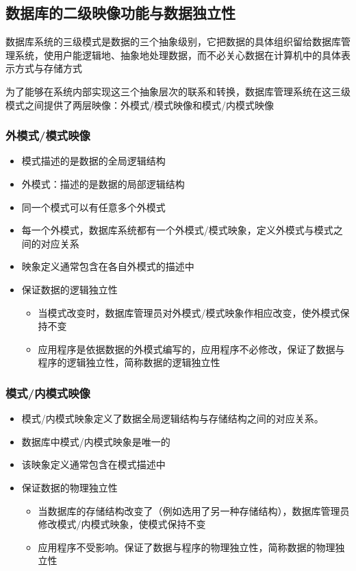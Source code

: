 \subsection{数据库的二级映像功能与数据独立性}
数据库系统的三级模式是数据的三个抽象级别，它把数据的具体组织留给数据库管理系统，使用户能逻辑地、抽象地处理数据，而不必关心数据在计算机中的具体表示方式与存储方式

为了能够在系统内部实现这三个抽象层次的联系和转换，数据库管理系统在这三级模式之间提供了两层映像：外模式/模式映像和模式/内模式映像

\subsubsection{外模式/模式映像}
\begin{itemize}
    \item 模式描述的是数据的全局逻辑结构
    \item 外模式：描述的是数据的局部逻辑结构 
    \item 同一个模式可以有任意多个外模式 
    \item 每一个外模式，数据库系统都有一个外模式/模式映象，定义外模式与模式之间的对应关系
    \item 映象定义通常包含在各自外模式的描述中
    \item 保证数据的逻辑独立性
    \begin{itemize}
        \item 当模式改变时，数据库管理员对外模式/模式映象作相应改变，使外模式保持不变
        \item 应用程序是依据数据的外模式编写的，应用程序不必修改，保证了数据与程序的逻辑独立性，简称数据的逻辑独立性
    \end{itemize}
\end{itemize}

\subsubsection{模式/内模式映像}
\begin{itemize}
    \item 模式/内模式映象定义了数据全局逻辑结构与存储结构之间的对应关系。
    \item 数据库中模式/内模式映象是唯一的
    \item 该映象定义通常包含在模式描述中
    \item 保证数据的物理独立性
    \begin{itemize}
        \item 当数据库的存储结构改变了（例如选用了另一种存储结构），数据库管理员修改模式/内模式映象，使模式保持不变
        \item 应用程序不受影响。保证了数据与程序的物理独立性，简称数据的物理独立性
    \end{itemize}
\end{itemize}

